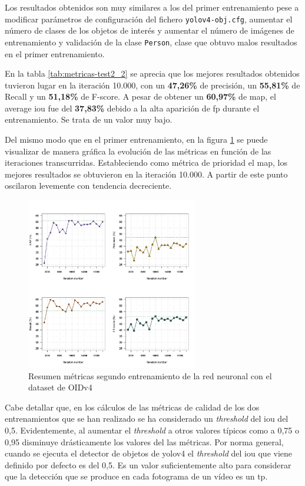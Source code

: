 Los resultados obtenidos son muy similares a los del primer entrenamiento pese a modificar parámetros de configuración del fichero \texttt{yolov4-obj.cfg}, aumentar el número de clases de los objetos de interés y aumentar el número de imágenes de entrenamiento y validación de la clase \texttt{Person}, clase que obtuvo malos resultados en el primer entrenamiento.

En la tabla \ref{tab:metricas-test2_2} se aprecia que los mejores resultados obtenidos tuvieron lugar en la iteración 10.000, con un \textbf{47,26\%} de precisión, un \textbf{55,81\%} de Recall y un \textbf{51,18\%} de F-score. A pesar de obtener un \textbf{60,97\%} de \gls{map}, el average \gls{iou} fue del \textbf{37,83\%} debido a la alta aparición de \gls{fp} durante el entrenamiento. Se trata de un valor muy bajo.

Del mismo modo que en el primer entrenamiento, en la figura \ref{fig:metrics-train2} se puede visualizar de manera gráfica la evolución de las métricas en función de las iteraciones transcurridas. Estableciendo como métrica de prioridad el \gls{map}, los mejores resultados se obtuvieron en la iteración 10.000. A partir de este punto oscilaron levemente con tendencia decreciente.

\begin{figure}[ht]
\centering
\includegraphics[width=0.67\textwidth]{img/chapters/resultados/metricas/metrics-train2.png}
\caption{\label{fig:metrics-train2}Resumen métricas segundo entrenamiento de la red neuronal con el dataset de OIDv4}
\end{figure}

Cabe detallar que, en los cálculos de las métricas de calidad de los dos entrenamientos que se han realizado se ha considerado un \textit{threshold} del \gls{iou} del 0,5. Evidentemente, al aumentar el \textit{threshold} a otros valores típicos como a 0,75 o 0,95 disminuye drásticamente los valores del las métricas. Por norma general, cuando se ejecuta el detector de objetos de \gls{yolov4} el \textit{threshold} del \gls{iou} que viene definido por defecto es del 0,5. Es un valor suficientemente alto para considerar que la detección que se produce en cada fotograma de un vídeo es un \gls{tp}.

